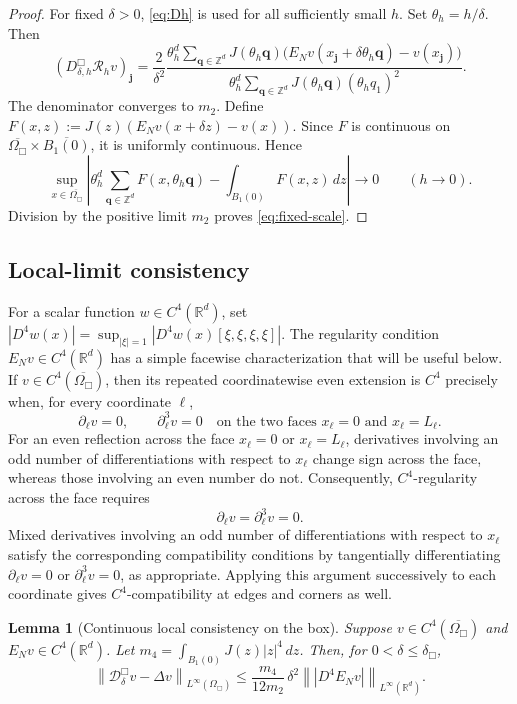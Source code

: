 \documentclass[11pt]{article}
\newtheorem{lemma}[theorem]{Lemma}
\theoremstyle{definition}
\newcommand{\R}{\mathbb{R}}
\newcommand{\Z}{\mathbb{Z}}
\newcommand{\cD}{\mathcal{D}}
\newcommand{\cR}{\mathcal{R}}
\newcommand{\norm}[1]{\left\lVert #1\right\rVert}
\newcommand{\jj}{\bm j}
\newcommand{\qq}{\bm q}
\begin{document}
\begin{proof}
For fixed $\delta>0$, \eqref{eq:Dh} is used for all sufficiently small $h$.  Set $\theta_h=h/\delta$.  Then
\[
 (D_{\delta,h}^{\Box}\cR_hv)_{\jj}
 =
 \frac{2}{\delta^2}
 \frac{\displaystyle
 \theta_h^d\sum_{\qq\in\Z^d}
 J(\theta_h\qq)
 \big(E_Nv(x_{\jj}+\delta\theta_h\qq)-v(x_{\jj})\big)}
 {\displaystyle
 \theta_h^d\sum_{\qq\in\Z^d}
 J(\theta_h\qq)(\theta_hq_1)^2}.
\]
The denominator converges to $m_2$.  Define $F(x,z):=J(z)(E_Nv(x+\delta z)-v(x))$.
Since $F$ is continuous on
$\overline{\Omega_{\Box}}\times\overline{B_1(0)}$, it is uniformly
continuous.  Hence
\[
 \sup_{x\in\overline{\Omega_{\Box}}}
 \left|
 \theta_h^d\sum_{\qq\in\Z^d}F(x,\theta_h\qq)
 -
 \int_{B_1(0)}F(x,z)\,dz
 \right|
 \longrightarrow0
 \qquad(h\to0).
\]
Division by the positive limit $m_2$ proves \eqref{eq:fixed-scale}.
\end{proof}

\subsection{Local-limit consistency}

For a scalar function $w\in C^4(\R^d)$, set $|D^4w(x)|=\sup_{|\xi|=1}|D^4w(x)[\xi,\xi,\xi,\xi]|$. The regularity condition $E_Nv\in C^4(\R^d)$ has a simple
facewise characterization that will be useful below.  If
$v\in C^4(\overline{\Omega_{\Box}})$, then its repeated coordinatewise even
extension is $C^4$ precisely when, for every coordinate $\ell$,
\begin{equation}
\label{eq:reflection-compatibility}
 \partial_\ell v=0,
 \qquad
 \partial_\ell^3 v=0
 \quad\text{on the two faces }x_\ell=0\text{ and }x_\ell=L_\ell.
\end{equation}
For an even reflection across the face
$x_\ell=0$ or $x_\ell=L_\ell$, derivatives involving an odd number of
differentiations with respect to $x_\ell$ change sign across the face, whereas
those involving an even number do not.  Consequently, $C^4$-regularity across
the face requires
\[
\partial_\ell v=\partial_\ell^3v=0.
\]
Mixed derivatives involving an odd number of differentiations with respect to
$x_\ell$ satisfy the corresponding compatibility conditions by tangentially
differentiating $\partial_\ell v=0$ or $\partial_\ell^3v=0$, as appropriate.
Applying this argument successively to each coordinate gives
$C^4$-compatibility at edges and corners as well.

\begin{lemma}[Continuous local consistency on the box]
\label{lem:cont-local-consistency}
Suppose $v\in C^4(\overline{\Omega_{\Box}})$ and $E_Nv\in C^4(\R^d)$.  Let $m_4=\int_{B_1(0)}J(z)|z|^4\,dz$.  Then, for $0<\delta\le\delta_{\Box}$,
\begin{equation}
\label{eq:cont-local-error}
 \norm{\cD_\delta^{\Box}v-\Delta v}_{L^\infty(\Omega_{\Box})}
 \le
 \frac{m_4}{12m_2}\,\delta^2
 \norm{|D^4E_Nv|}_{L^\infty(\R^d)}.
\end{equation}
\end{lemma}
\end{document}

